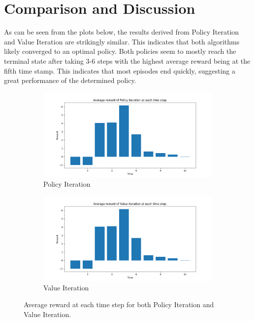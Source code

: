 \documentclass{class}
\begin{document}
\section{Comparison and Discussion}
\label{sec: comparison and discussion}
As can be seen from the plots below, the results derived from Policy Iteration and Value Iteration are strikingly similar. This indicates that both algorithms likely converged to an optimal policy. Both policies seem to mostly reach the terminal state after taking 3-6 steps with the highest average reward being at the fifth time stamp. This indicates that most episodes end quickly, suggesting a great performance of the determined policy.

\begin{figure}[H]
    \centering
    \begin{subfigure}[t]{0.48\linewidth}
        \centering
        \includegraphics[width=\linewidth]{../plots/r_over_time/policy_iteration_r_over_time.png}
        \caption{Policy Iteration}
        \label{fig:policy_iteration_r_over_time}
    \end{subfigure}
    \hfill
    \begin{subfigure}[t]{0.48\linewidth}
        \centering
        \includegraphics[width=\linewidth]{../plots/r_over_time/value_iteration_r_over_time.png}
        \caption{Value Iteration}
        \label{fig:value_iterations_r_over_time}
    \end{subfigure}
    \caption{Average reward at each time step for both Policy Iteration and Value Iteration.}
    \label{fig:DP_reward_comparison}
\end{figure}
\end{document}
